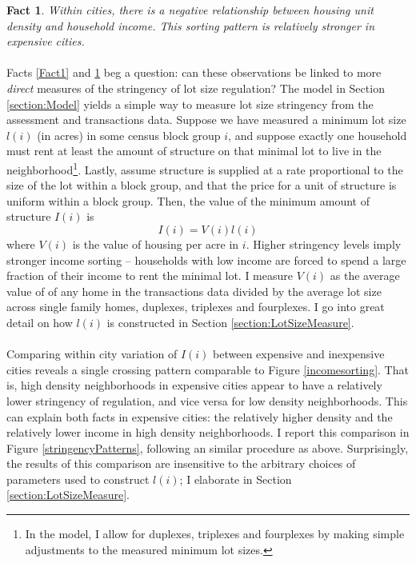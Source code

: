 \documentclass[]{article}
\newtheorem{theorem}{Fact}
\begin{document}
\begin{theorem}\label{Fact2}
	Within cities, there is a negative relationship between housing unit density and household income. This sorting pattern is relatively stronger in expensive cities.
\end{theorem}
\paragraph*{}
Facts \ref{Fact1} and \ref{Fact2} beg a question: can these observations be linked to more \textit{direct} measures of the stringency of lot size regulation? The model in Section \ref{section:Model} yields a simple way to measure lot size stringency from the assessment and transactions data. Suppose we have measured a minimum lot size $l(i)$ (in acres) in some census block group $i$, and suppose exactly one household must rent at least the amount of structure on that minimal lot to live in the neighborhood\footnote{In the model, I allow for duplexes, triplexes and fourplexes by making simple adjustments to the measured minimum lot sizes.}. Lastly, assume structure is supplied at a rate proportional to the size of the lot within a block group, and that the price for a unit of structure is uniform within a block group. Then, the value of the minimum amount of structure $I(i)$ is
\begin{equation}\label{observedStringency}
I(i) = V(i)l(i)
\end{equation}
where $V(i)$ is the value of housing per acre in $i$. Higher stringency levels imply stronger income sorting -- households with low income are forced to spend a large fraction of their income to rent the minimal lot. I measure $V(i)$ as the average value of of any home in the transactions data divided by the average lot size across single family homes, duplexes, triplexes and fourplexes. I go into great detail on how $l(i)$ is constructed in Section \ref{section:LotSizeMeasure}.
\paragraph*{}
Comparing within city variation of $I(i)$ between expensive and inexpensive cities reveals a single crossing pattern comparable to Figure \ref{incomesorting}. That is, high density neighborhoods in expensive cities appear to have a relatively lower stringency of regulation, and vice versa for low density neighborhoods. This can explain both facts in expensive cities: the relatively higher density and the relatively lower income in high density neighborhoods. I report this comparison in Figure \ref{stringencyPatterns}, following an similar procedure as above. Surprisingly, the results of this comparison are insensitive to the arbitrary choices of parameters used to construct $l(i)$; I elaborate in Section \ref{section:LotSizeMeasure}. 
\end{document}
